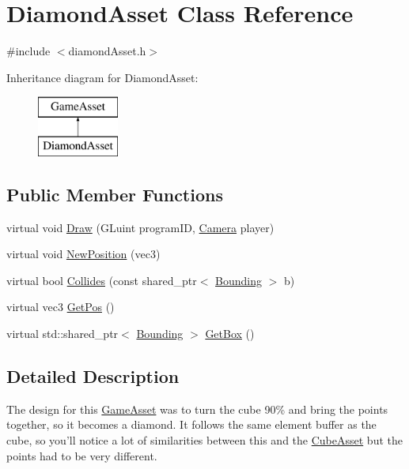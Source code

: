 \hypertarget{classDiamondAsset}{\section{Diamond\-Asset Class Reference}
\label{classDiamondAsset}
}


{\ttfamily \#include $<$diamond\-Asset.\-h$>$}

Inheritance diagram for Diamond\-Asset\-:\begin{figure}[H]
\begin{center}
\leavevmode
\includegraphics[height=2.000000cm]{classDiamondAsset}
\end{center}
\end{figure}
\subsection*{Public Member Functions}
\begin{DoxyCompactItemize}
\item 
virtual void \hyperlink{classDiamondAsset_a802d11c439859b048533a94fbe662e96}{Draw} (G\-Luint program\-I\-D, \hyperlink{classCamera}{Camera} player)
\item 
virtual void \hyperlink{classDiamondAsset_a266fe301cfa7fc82195d85d29901a6b8}{New\-Position} (vec3)
\item 
virtual bool \hyperlink{classDiamondAsset_af6f6a31e3f6c52e1980f270fd153f0ae}{Collides} (const shared\-\_\-ptr$<$ \hyperlink{classBounding}{Bounding} $>$ b)
\item 
virtual vec3 \hyperlink{classDiamondAsset_aa387857fb5c62227b671500b28cee4df}{Get\-Pos} ()
\item 
virtual std\-::shared\-\_\-ptr$<$ \hyperlink{classBounding}{Bounding} $>$ \hyperlink{classDiamondAsset_acb927e5213c69cf7042bdb80b984b033}{Get\-Box} ()
\end{DoxyCompactItemize}


\subsection{Detailed Description}
The design for this \hyperlink{classGameAsset}{Game\-Asset} was to turn the cube 90\% and bring the points together, so it becomes a diamond. It follows the same element buffer as the cube, so you'll notice a lot of similarities between this and the \hyperlink{classCubeAsset}{Cube\-Asset} but the points had to be very different. 

